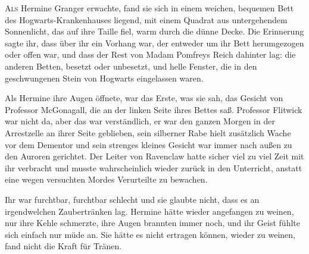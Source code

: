 
\lettrine{A}{ls} Hermine Granger erwachte, fand sie sich in einem weichen, bequemen Bett des Hogwarts-Krankenhauses liegend, mit einem Quadrat aus untergehendem Sonnenlicht, das auf ihre Taille fiel, warm durch die dünne Decke. Die Erinnerung sagte ihr, dass über ihr ein Vorhang war, der entweder um ihr Bett herumgezogen oder offen war, und dass der Rest von Madam Pomfreys Reich dahinter lag: die anderen Betten, besetzt oder unbesetzt, und helle Fenster, die in den geschwungenen Stein von Hogwarts eingelassen waren.

Als Hermine ihre Augen öffnete, war das Erste, was sie sah, das Gesicht von Professor McGonagall, die an der linken Seite ihres Bettes saß. Professor Flitwick war nicht da, aber das war verständlich, er war den ganzen Morgen in der Arrestzelle an ihrer Seite geblieben, sein silberner Rabe hielt zusätzlich Wache vor dem Dementor und sein strenges kleines Gesicht war immer nach außen zu den Auroren gerichtet. Der Leiter von Ravenclaw hatte sicher viel zu viel Zeit mit ihr verbracht und musste wahrscheinlich wieder zurück in den Unterricht, anstatt eine wegen versuchten Mordes Verurteilte zu bewachen.

Ihr war furchtbar, furchtbar schlecht und sie glaubte nicht, dass es an irgendwelchen Zaubertränken lag. Hermine hätte wieder angefangen zu weinen, nur ihre Kehle schmerzte, ihre Augen brannten immer noch, und ihr Geist fühlte sich einfach nur müde an. Sie hätte es nicht ertragen können, wieder zu weinen, fand nicht die Kraft für Tränen.

